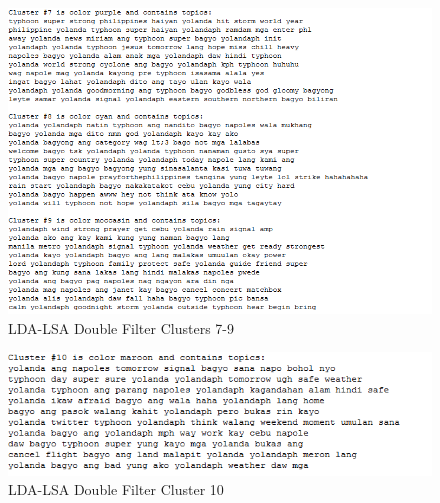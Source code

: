 \begin{figure}
    \centering
    \includegraphics[width=\textwidth, height=\textheight,keepaspectratio]{Method1Cluster3.PNG}
    \caption{LDA-LSA Double Filter Clusters 7-9}
    \label{fig:my_label5}
\end{figure}

\begin{figure}
    \centering
    \includegraphics[width=\textwidth, height=\textheight,keepaspectratio]{Method1Cluster4.PNG}
    \caption{LDA-LSA Double Filter Cluster 10}
    \label{fig:my_label6}
\end{figure}

